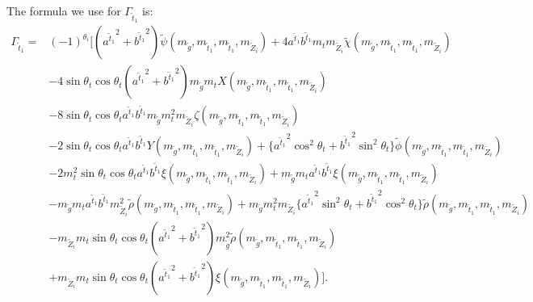 \documentclass[final,3p,times,pdflatex]{elsarticle}
\begin{document}
The formula we use for $\Gamma_{\tilde{t}_1}$ is:
\begin{equation}
\begin{aligned}
\Gamma_{\tilde{t}_1} = & (-1)^{\theta_i}\Big[({a^{\tilde{t}_1}}^2 + {b^{\tilde{t}_1}}^2)\tilde{\psi} (m_{\tilde{g}},m_{\tilde{t}_1}, m_{\tilde{t}_1}, m_{\tilde{Z}_i}) + 4 a^{\tilde{t}_1} b^{\tilde{t}_1}m_{t}m_{\tilde{Z}_i}\tilde{\chi} (m_{\tilde{g}},m_{\tilde{t}_1}, m_{\tilde{t}_1}, m_{\tilde{Z}_i}) \\ & - 4 \sin\theta_t \cos\theta_t({a^{\tilde{t}_1}}^2 + {b^{\tilde{t}_1}}^2) m_{\tilde{g}} m_{t} X(m_{\tilde{g}},m_{\tilde{t}_1}, m_{\tilde{t}_1}, m_{\tilde{Z}_i}) \\ &  -8 \sin\theta_t \cos\theta_t a^{\tilde{t}_1} b^{\tilde{t}_1} m_{\tilde{g}} m_{t}^{2} m_{\tilde{Z}_i}\zeta (m_{\tilde{g}},m_{\tilde{t}_1}, m_{\tilde{t}_1}, m_{\tilde{Z}_i}) \\ & -2\sin\theta_t \cos\theta_t a^{\tilde{t}_1} b^{\tilde{t}_1} Y(m_{\tilde{g}},m_{\tilde{t}_1}, m_{\tilde{t}_1}, m_{\tilde{Z}_i}) + \{{a^{\tilde{t}_1}}^2 \cos^2 \theta_t + {b^{\tilde{t}_1}}^2 \sin^2 \theta_t\}\tilde{\phi} (m_{\tilde{g}},m_{\tilde{t}_1}, m_{\tilde{t}_1}, m_{\tilde{Z}_i}) \\ & - 2 m_{t}^2 \sin\theta_t \cos\theta_t a^{\tilde{t}_1} b^{\tilde{t}_1} \xi (m_{\tilde{g}},m_{\tilde{t}_1}, m_{\tilde{t}_1}, m_{\tilde{Z}_i}) + m_{\tilde{g}} m_{t} a^{\tilde{t}_1} b^{\tilde{t}_1} \xi (m_{\tilde{g}},m_{\tilde{t}_1}, m_{\tilde{t}_1}, m_{\tilde{Z}_i}) \\ & - m_{\tilde{g}} m_{t} a^{\tilde{t}_1} b^{\tilde{t}_1}m_{\tilde{Z}_{i}}^2 \tilde{\rho} (m_{\tilde{g}},m_{\tilde{t}_1}, m_{\tilde{t}_1}, m_{\tilde{Z}_i}) + m_{\tilde{g}}m_{t}^2 m_{\tilde{Z}_i}\{{a^{\tilde{t}_1}}^2 \sin^2 \theta_t  + {b^{\tilde{t}_1}}^2 \cos^2 \theta_t \}\tilde{\rho} (m_{\tilde{g}},m_{\tilde{t}_1}, m_{\tilde{t}_1}, m_{\tilde{Z}_i}) \\ & -m_{\tilde{Z}_i} m_{t}\sin\theta_t \cos\theta_t ({a^{\tilde{t}_1}}^2 + {b^{\tilde{t}_1}}^2)m_{\tilde{g}}^2 \tilde{\rho} (m_{\tilde{g}},m_{\tilde{t}_1}, m_{\tilde{t}_1}, m_{\tilde{Z}_i}) \\ & + m_{\tilde{Z}_i} m_{t} \sin\theta_{t} \cos\theta_{t} ({a^{\tilde{t}_1}}^2 + {b^{\tilde{t}_1}}^2) \xi (m_{\tilde{g}},m_{\tilde{t}_1}, m_{\tilde{t}_1}, m_{\tilde{Z}_i})\Big].
\end{aligned}
\end{equation}
\end{document}
